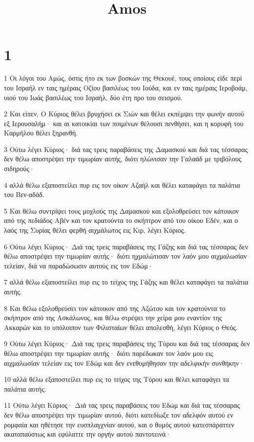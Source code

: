

\title{Amos}


\chapter{1}

\par 1 Οι λόγοι του Αμώς, όστις ήτο εκ των βοσκών της Θεκουέ, τους οποίους είδε περί του Ισραήλ εν ταις ημέραις Οζίου βασιλέως του Ιούδα, και εν ταις ημέραις Ιεροβοάμ, υιού του Ιωάς βασιλέως του Ισραήλ, δύο έτη προ του σεισμού.
\par 2 Και είπεν, Ο Κύριος θέλει βρυχήσει εκ Σιών και θέλει εκπέμψει την φωνήν αυτού εξ Ιερουσαλήμ· και αι κατοικίαι των ποιμένων θέλουσι πενθήσει, και η κορυφή του Καρμήλου θέλει ξηρανθή.
\par 3 Ούτω λέγει Κύριος· διά τας τρεις παραβάσεις της Δαμασκού και διά τας τέσσαρας δεν θέλω αποστρέψει την τιμωρίαν αυτής, διότι ηλώνισαν την Γαλαάδ με τριβόλους σιδηρούς·
\par 4 αλλά θέλω εξαποστείλει πυρ εις τον οίκον Αζαήλ και θέλει καταφάγει τα παλάτια του Βεν-αδάδ.
\par 5 Και θέλω συντρίψει τους μοχλούς της Δαμασκού και εξολοθρεύσει τον κάτοικον από της πεδιάδος Αβέν και τον κρατούντα το σκήπτρον από του οίκου Εδέν, και ο λαός της Συρίας θέλει φερθή αιχμάλωτος εις Κιρ, λέγει Κύριος.
\par 6 Ούτω λέγει Κύριος· Διά τας τρεις παραβάσεις της Γάζης και διά τας τέσσαρας δεν θέλω αποστρέψει την τιμωρίαν αυτής· διότι ηχμαλώτισαν τον λαόν μου αιχμαλωσίαν τελείαν, διά να παραδώσωσιν αυτούς εις τον Εδώμ·
\par 7 αλλά θέλω εξαποστείλει πυρ εις το τείχος της Γάζης και θέλει καταφάγει τα παλάτια αυτής.
\par 8 Και θέλω εξολοθρεύσει τον κάτοικον από της Αζώτου και τον κρατούντα το σκήπτρον από της Ασκάλωνος, και θέλω στρέψει την χείρα μου εναντίον της Ακκαρών και το υπόλοιπον των Φιλισταίων θέλει απολεσθή, λέγει Κύριος ο Θεός.
\par 9 Ούτω λέγει Κύριος· Διά τας τρεις παραβάσεις της Τύρου και διά τας τέσσαρας δεν θέλω αποστρέψει την τιμωρίαν αυτής· διότι παρέδωκαν τον λαόν μου εις αιχμαλωσίαν τελείαν εις τον Εδώμ και δεν ενεθυμήθησαν την αδελφικήν συνθήκην·
\par 10 αλλά θέλω εξαποστείλει πυρ εις το τείχος της Τύρου και θέλει καταφάγει τα παλάτια αυτής.
\par 11 Ούτω λέγει Κύριος· Διά τας τρεις παραβάσεις του Εδώμ και διά τας τέσσαρας δεν θέλω αποστρέψει την τιμωρίαν αυτού, διότι κατεδίωξε τον αδελφόν αυτού εν ρομφαία και ηθέτησε την ευσπλαγχνίαν αυτού, και ο θυμός αυτού κατεσπάραττεν ακαταπαύστως και εφύλαττε την οργήν αυτού παντοτεινά·
